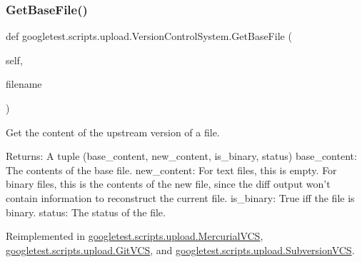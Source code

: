 \mbox{\label{classgoogletest_1_1scripts_1_1upload_1_1_version_control_system_af04094a3d55158ec8731c57af99eaf4c}} 
\subsubsection{\texorpdfstring{GetBaseFile()}{GetBaseFile()}}
{\footnotesize\ttfamily def googletest.\+scripts.\+upload.\+Version\+Control\+System.\+Get\+Base\+File (\begin{DoxyParamCaption}\item[{}]{self,  }\item[{}]{filename }\end{DoxyParamCaption})}

\begin{DoxyVerb}Get the content of the upstream version of a file.

Returns:
  A tuple (base_content, new_content, is_binary, status)
base_content: The contents of the base file.
new_content: For text files, this is empty.  For binary files, this is
  the contents of the new file, since the diff output won't contain
  information to reconstruct the current file.
is_binary: True iff the file is binary.
status: The status of the file.
\end{DoxyVerb}
 

Reimplemented in \mbox{\hyperlink{classgoogletest_1_1scripts_1_1upload_1_1_mercurial_v_c_s_ab76cf6be7060406969e511b335874fb9}{googletest.\+scripts.\+upload.\+Mercurial\+V\+CS}}, \mbox{\hyperlink{classgoogletest_1_1scripts_1_1upload_1_1_git_v_c_s_ac9fcd4827b37346353ea602106399f07}{googletest.\+scripts.\+upload.\+Git\+V\+CS}}, and \mbox{\hyperlink{classgoogletest_1_1scripts_1_1upload_1_1_subversion_v_c_s_a1a49556f2fec864cb13543a2330a32a3}{googletest.\+scripts.\+upload.\+Subversion\+V\+CS}}.

\mbox{\label{classgoogletest_1_1scripts_1_1upload_1_1_version_control_system_ad99771f90fc21df8fce3152fa5567299}} 
